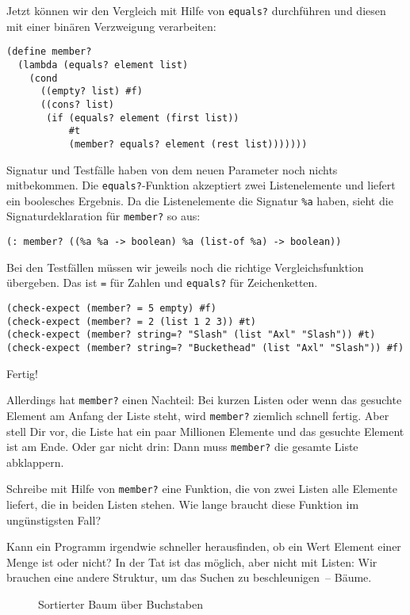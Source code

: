 Jetzt können wir den Vergleich mit Hilfe von \lstinline{equals?}
durchführen und diesen mit einer binären Verzweigung verarbeiten:
%
\begin{lstlisting}
(define member?
  (lambda (equals? element list)
    (cond
      ((empty? list) #f)
      ((cons? list)
       (if (equals? element (first list))
           #t
           (member? equals? element (rest list)))))))
\end{lstlisting}
%
Signatur und Testfälle haben von dem neuen Parameter noch nichts
mitbekommen.  Die \lstinline{equals?}-Funktion akzeptiert zwei
Listenelemente und liefert ein boolesches Ergebnis.  Da die
Listenelemente die Signatur \lstinline{%a}
haben, sieht die Signaturdeklaration für \lstinline{member?} so aus:
%
\begin{lstlisting}
(: member? ((%a %a -> boolean) %a (list-of %a) -> boolean))
\end{lstlisting}
%
Bei den Testfällen müssen wir jeweils noch die richtige
Vergleichsfunktion übergeben.  Das ist \lstinline{=} für Zahlen und
\lstinline{equals?} für Zeichenketten.
%
\begin{lstlisting}
(check-expect (member? = 5 empty) #f)
(check-expect (member? = 2 (list 1 2 3)) #t)
(check-expect (member? string=? "Slash" (list "Axl" "Slash")) #t)
(check-expect (member? string=? "Buckethead" (list "Axl" "Slash")) #f)
\end{lstlisting}
%
Fertig!

Allerdings hat \lstinline{member?} einen Nachteil: Bei kurzen Listen
oder wenn das gesuchte Element am Anfang der Liste steht, wird
\lstinline{member?} ziemlich schnell fertig.  Aber stell Dir vor, die
Liste hat ein paar Millionen Elemente und das gesuchte Element ist am
Ende.  Oder gar nicht drin: Dann muss \lstinline{member?} die gesamte
Liste abklappern.
%
\begin{aufgabeinline}
  Schreibe mit Hilfe von \lstinline{member?} eine Funktion, die von
  zwei Listen alle Elemente liefert, die in beiden Listen stehen.
  Wie lange braucht diese Funktion im
  ungünstigsten Fall?
\end{aufgabeinline}
%
Kann ein Programm irgendwie schneller herausfinden, ob ein Wert Element einer Menge
ist oder nicht?  In der Tat ist das möglich, aber nicht mit Listen:
Wir brauchen eine andere Struktur, um das Suchen zu beschleunigen~--
Bäume.

\begin{figure}[tbh]
  \caption{Sortierter Baum über Buchstaben}
  \label{fig:searchtree}
\end{figure}


